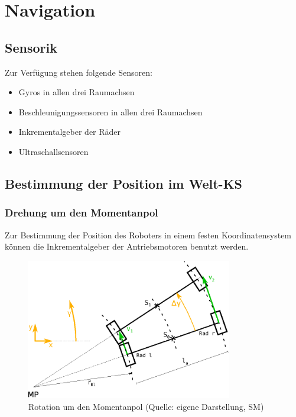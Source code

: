 \renewcommand{\autoren}{Stephan Morongowski}
\newpage
\section{Navigation}
\subsection{Sensorik}
Zur Verfügung stehen folgende Sensoren:
\begin{itemize}
\item Gyros in allen drei Raumachsen
\item Beschleunigungssensoren in allen drei Raumachsen
\item Inkrementalgeber der Räder
\item Ultraschallsensoren
\end{itemize}

\subsection{Bestimmung der Position im Welt-KS}

\subsubsection{Drehung um den Momentanpol}
\label{turningVelocityPole}
Zur Bestimmung der Position des Roboters in einem festen Koordinatensystem können die Inkrementalgeber der Antriebsmotoren benutzt werden.

\begin{figure}[h]  %
\centering\includegraphics[width=0.8\textwidth]{images/Kurvenkinematic.eps}
\caption{Rotation um den Momentanpol \newline (Quelle: eigene Darstellung, SM)}
\label{kurvenkinematik}
\end{figure}

